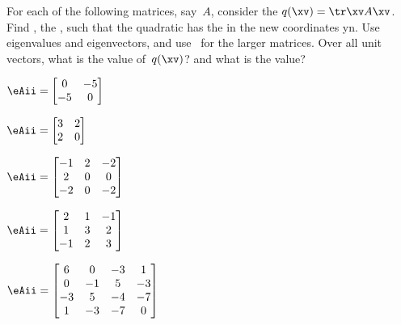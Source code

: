 \begin{exercise} \label{ex:} 
For each of the following matrices, say~\(A\), consider the  \(q(\xv)=\tr\xv A\xv\).
Find , the , such that the quadratic has the  in the new coordinates \hlist yn.
Use eigenvalues and eigenvectors, and use \script\ for the larger matrices.
Over all unit vectors, what is the  value of~\(q(\xv)\)? and what is the  value?

\begin{parts}
\item \(\eAii=\begin{bmatrix} 0&-5
\\-5&0 \end{bmatrix}\)

\item \(\eAii=\begin{bmatrix} 3&2
\\2&0 \end{bmatrix}\)

\item \(\eAii=\begin{bmatrix} -1&2&-2
\\2&0&0
\\-2&0&-2 \end{bmatrix}\)

\item \(\eAii=\begin{bmatrix} 2&1&-1
\\1&3&2
\\-1&2&3 \end{bmatrix}\)

\item \(\eAii=\begin{bmatrix} 6&0&-3&1
\\0&-1&5&-3
\\-3&5&-4&-7
\\1&-3&-7&0 \end{bmatrix}\)


\end{parts}
\end{exercise}
